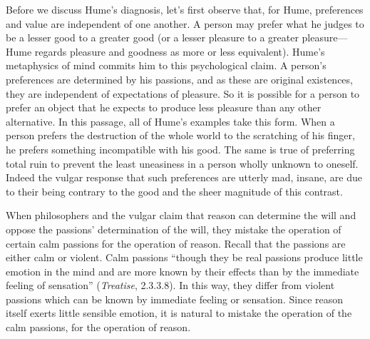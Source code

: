 
Before we discuss Hume's diagnosis, let's first observe that, for Hume, preferences and value are independent of one another. A person may prefer what he judges to be a lesser good to a greater good (or a lesser pleasure to a greater pleasure---Hume regards pleasure and goodness as more or less equivalent). Hume's metaphysics of mind commits him to this psychological claim. A person's preferences are determined by his passions, and as these are original existences, they are independent of expectations of pleasure. So it is possible for a person to prefer an object that he expects to produce less pleasure than any other alternative. In this passage, all of Hume's examples take this form. When a person prefers the destruction of the whole world to the scratching of his finger, he prefers something incompatible with his good. The same is true of preferring total ruin to prevent the least uneasiness in a person wholly unknown to oneself. Indeed the vulgar response that such preferences are utterly mad, insane, are due to their being contrary to the good and the sheer magnitude of this contrast.

When philosophers and the vulgar claim that reason can determine the will and oppose the passions' determination of the will, they mistake the operation of certain calm passions for the operation of reason. Recall that the passions are either calm or violent. Calm passions ``though they be real passions produce little emotion in the mind and are more known by their effects than by the immediate feeling of sensation'' (\emph{Treatise}, 2.3.3.8). In this way, they differ from violent passions which can be known by immediate feeling or sensation. Since reason itself exerts little sensible emotion, it is natural to mistake the operation of the calm passions, for the operation of reason.

